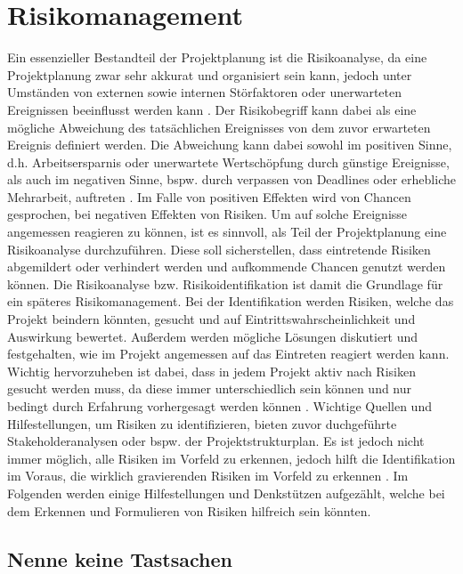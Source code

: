 \documentclass[ThesisDJ.tex]{subfiles}
\begin{document}
\section{Risikomanagement}
Ein essenzieller Bestandteil der Projektplanung ist die Risikoanalyse, da eine Projektplanung zwar sehr akkurat und organisiert sein kann, jedoch unter Umständen von externen sowie internen Störfaktoren oder unerwarteten Ereignissen beeinflusst werden kann \cite{cicek2022risikomanagement}.
Der Risikobegriff kann dabei als eine mögliche Abweichung des tatsächlichen Ereignisses von dem zuvor erwarteten Ereignis definiert werden. Die Abweichung kann dabei sowohl im positiven Sinne, d.h. Arbeitsersparnis oder unerwartete Wertschöpfung durch günstige Ereignisse, als auch im negativen Sinne, bspw. durch verpassen von Deadlines oder erhebliche Mehrarbeit, auftreten \cite{holgerseibold2006}. Im Falle von positiven Effekten wird von Chancen gesprochen, bei negativen Effekten von Risiken. Um auf solche Ereignisse angemessen reagieren zu können, ist es sinnvoll, als Teil der Projektplanung eine Risikoanalyse durchzuführen. Diese soll sicherstellen, dass eintretende Risiken abgemildert oder verhindert werden und aufkommende Chancen genutzt werden können. Die Risikoanalyse bzw. Risikoidentifikation ist damit die Grundlage für ein späteres Risikomanagement.
Bei der Identifikation werden Risiken, welche das Projekt beindern könnten, gesucht und auf Eintrittswahrscheinlichkeit und Auswirkung bewertet. Außerdem werden mögliche Lösungen diskutiert und festgehalten, wie im Projekt angemessen auf das Eintreten reagiert werden kann. Wichtig hervorzuheben ist dabei, dass in jedem Projekt aktiv nach Risiken gesucht werden muss, da diese immer unterschiedlich sein können und nur bedingt durch Erfahrung vorhergesagt werden können \cite{cicek2022risikomanagement}. Wichtige Quellen und Hilfestellungen, um Risiken zu identifizieren, bieten zuvor duchgeführte Stakeholderanalysen oder bspw. der Projektstrukturplan. Es ist jedoch nicht immer möglich, alle Risiken im Vorfeld zu erkennen, jedoch hilft die Identifikation im Voraus, die wirklich gravierenden Risiken im Vorfeld zu erkennen \cite{holgerseibold2006}. Im Folgenden werden einige Hilfestellungen und Denkstützen aufgezählt, welche bei dem Erkennen und Formulieren von Risiken hilfreich sein könnten.

\subsection{Nenne keine Tastsachen}
\end{document}

